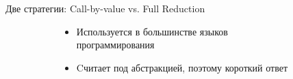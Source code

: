 \documentclass[aspectratio=169
  , xcolor={svgnames}
  , hyperref=
      { colorlinks
      , urlcolor=DarkBlue
      }
  , russian  %
  ]{beamer}
\newcommand{\xarr}[1]{\xrightarrow{\ #1\ }}
\renewcommand{\arr}{\rightarrow}
\newcommand{\cbv}{\xarr{cbv}}
\newcommand{\abs}[2]{\ensuremath{(\lambda #1 . #2)}}
\newcommand{\lam}[2]{\ensuremath{\abs{#1}{#2}}}
\newcommand{\subst}[3]{\ensuremath{[#1 \mapsto #2]#3}}
\begin{document}
\begin{frame}{Две стратегии: Call-by-value vs. Full Reduction}
\begin{figure}[ht]
  \begin{subfigure}[t]{.48\textwidth}
  \end{subfigure}
  \begin{subfigure}[t]{.48\textwidth}
   \end{subfigure}
\end{figure}


    \begin{figure}[t]
      \begin{subfigure}[t]{0.45\textwidth}
    \begin{itemize}
    \item[\faGood]    Используется в большинстве языков программирования
    \vspace{4em}
    \end{itemize}
      \end{subfigure}
      \begin{subfigure}[t]{0.45\textwidth}
    \begin{itemize}
      \item[\faGood] Cчитает под абстракцией, поэтому короткий ответ
    \end{itemize}
      \end{subfigure}
    \end{figure}
\end{frame}
\end{document}
